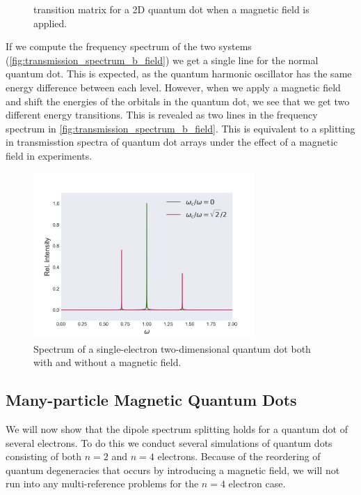 \begin{figure}
\begin{center}
\begin{minipage}{0.4\textwidth}
        \caption{transition matrix for a 2D quantum dot when a magnetic field
            is applied.}
        \label{fig:transition_yes_b}
    \end{minipage}        
    \end{center}
\end{figure}

If we compute the frequency spectrum of the two systems
(\autoref{fig:transmission_spectrum_b_field}) we get a single line for the 
normal quantum dot. This is expected, as the quantum harmonic oscillator has 
the same energy difference between each level. However, when we apply a magnetic
field and shift the energies of the orbitals in the quantum dot, we see that we 
get two different energy transitions. This is revealed as two lines in the 
frequency spectrum in \autoref{fig:transmission_spectrum_b_field}. This is equivalent 
to a splitting in transmisstion spectra of quantum dot arrays under the effect 
of a magnetic field in experiments\cite{heitmann1993spectroscopy,meurer1992single}.

\begin{figure}
    \centering
    \includegraphics[width=0.75\textwidth]{results/figures/transmission_spectrum.png}
    \caption{Spectrum of a single-electron two-dimensional quantum dot both with and
        without a magnetic field.
    }
    \label{fig:transmission_spectrum_b_field}
\end{figure}

\subsection{Many-particle Magnetic Quantum Dots}

We will now show that the dipole spectrum splitting holds for a quantum dot of 
several electrons. To do this we conduct several simulations of quantum dots consisting 
of both $n=2$ and $n=4$ electrons. Because of the reordering of quantum degeneracies 
that occurs by introducing a magnetic field, we will not run into any multi-reference 
problems for the $n=4$ electron case.

